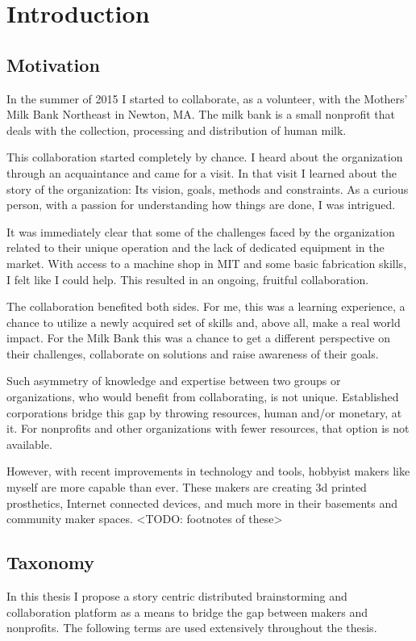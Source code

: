 \chapter{Introduction}
\label{chap_intro}

\section{Motivation}
In the summer of 2015 I started to collaborate, as a volunteer, with the Mothers’ Milk Bank Northeast in Newton, MA. The milk bank is a small nonprofit that deals with the collection, processing and distribution of human milk.

This collaboration started completely by chance. I heard about the organization through an acquaintance and came for a visit. In that visit I learned about the story of the organization: Its vision, goals, methods and constraints. As a curious person, with a passion for understanding how things are done, I was intrigued. 

It was immediately clear that some of the challenges faced by the organization related to their unique operation and the lack of dedicated equipment in the market. With access to a machine shop in MIT and some basic fabrication skills, I felt like I could help. This resulted in an ongoing, fruitful collaboration. 

The collaboration benefited both sides. For me, this was a learning experience, a chance to utilize a newly acquired set of skills and, above all, make a real world impact. For the Milk Bank this was a chance to get a different perspective on their challenges, collaborate on solutions and raise awareness of their goals.   

Such asymmetry of knowledge and expertise between two groups or organizations, who would benefit from collaborating, is not unique. Established corporations bridge this gap by throwing resources, human and/or monetary, at it. For nonprofits and other organizations with fewer resources, that option is not available.

However, with recent improvements in technology and tools, hobbyist makers like myself are more capable than ever. These makers are creating 3d printed prosthetics, Internet connected devices, and much more in their basements and community maker spaces. <TODO: footnotes of these>

\section{Taxonomy}
In this thesis I propose a story centric distributed brainstorming and collaboration platform as a means to bridge the gap between makers and nonprofits. The following terms are used extensively throughout the thesis.

